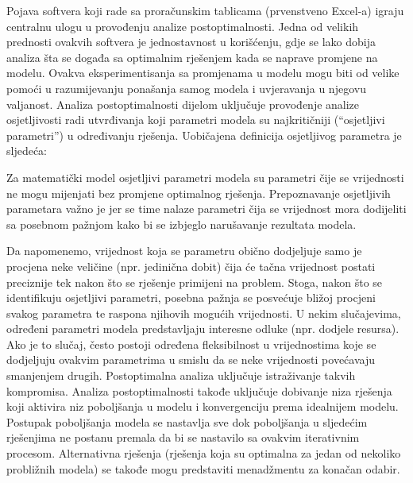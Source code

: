 \documentclass[a4paper, utf8, 11pt, colorlinks]{book}
\begin{document}
Pojava softvera koji rade sa proračunskim tablicama (prvenstveno Excel-a) igraju centralnu ulogu u provođenju analize postoptimalnosti. Jedna od velikih prednosti ovakvih softvera je jednostavnost u korišćenju, gdje se lako dobija analiza šta se događa sa optimalnim rješenjem kada se naprave promjene na modelu.  Ovakva eksperimentisanja sa promjenama u modelu mogu biti od velike pomoći u razumijevanju ponašanja samog modela i uvjeravanja u njegovu valjanost.  Analiza postoptimalnosti dijelom  uključuje provođenje analize osjetljivosti radi utvrđivanja koji parametri modela su najkritičniji (``osjetljivi parametri'') u određivanju rješenja. Uobičajena definicija osjetljivog parametra je sljedeća:

Za matematički model osjetljivi parametri modela su parametri čije se vrijednosti ne mogu mijenjati bez promjene optimalnog rješenja. Prepoznavanje osjetljivih parametara važno je jer se time nalaze parametri čija se vrijednost mora dodijeliti sa posebnom pažnjom kako bi se izbjeglo narušavanje rezultata modela.

Da napomenemo, vrijednost koja se parametru obično dodjeljuje samo je procjena neke veličine
(npr. jedinična dobit) čija će tačna vrijednost postati preciznije tek nakon što se rješenje primijeni na problem. Stoga, nakon
što se identifikuju osjetljivi parametri, posebna pažnja se posvećuje bližoj procjeni svakog parametra te  raspona njihovih mogućih vrijednosti.  U nekim slučajevima, određeni parametri modela predstavljaju interesne odluke (npr. dodjele resursa). Ako je to slučaj, često postoji određena fleksibilnost u vrijednostima koje se dodjeljuju ovakvim parametrima u smislu da se neke vrijednosti povećavaju  smanjenjem drugih. Postoptimalna analiza uključuje istraživanje takvih kompromisa. Analiza postoptimalnosti takođe uključuje dobivanje niza rješenja koji aktivira niz poboljšanja u modelu i konvergenciju prema idealnijem modelu. Postupak poboljšanja modela se nastavlja sve dok    poboljšanja u sljedećim rješenjima ne postanu premala da bi se nastavilo sa ovakvim iterativnim procesom.   Alternativna rješenja (rješenja koja su optimalna za jedan od nekoliko probližnih modela) se takođe mogu predstaviti menadžmentu za konačan odabir. 

\end{document}
